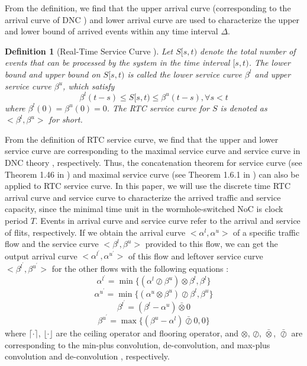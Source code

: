 \documentclass[10pt,journal]{IEEEtran}
\newtheorem{definition}{Definition}
\begin{document}
From the definition, we find that the upper arrival curve (corresponding to the arrival curve of DNC \cite{Boudec2001Network}) and lower arrival curve are used to characterize the upper and lower bound of arrived events within any time interval $\Delta$.

\begin{definition}[Real-Time Service Curve \cite{1253607}]
Let $S[s,t)$ denote the total number of events that can be processed by the system in the time interval $[s,t)$. The lower bound and upper bound on $S[s,t)$ is called the lower service curve $\beta^l$ and upper service curve $\beta^u$, which satisfy
$$\beta^l(t-s)\leq S[s,t)\leq \beta^u(t-s),\forall s<t$$
where $\beta^l(0)=\beta^u(0)=0$. The RTC service curve for $S$ is denoted as $<\beta^l,\beta^u>$ for short.
\end{definition}

From the definition of RTC service curve, we find that the upper and lower service curve are corresponding to the maximal service curve and service curve in DNC theory \cite{Boudec2001Network}, respectively. Thus, the concatenation theorem for service curve (see Theorem 1.46 in \cite{Boudec2001Network}) and maximal service curve (see Theorem 1.6.1 in \cite{Boudec2001Network}) can also be applied to RTC service curve. In this paper, we will use the discrete time RTC arrival curve and service curve to characterize the arrived traffic and service capacity, since the minimal time unit in the wormhole-switched NoC is clock period $T$. Events in arrival curve and service curve refer to the arrival and service of flits, respectively. If we obtain the arrival curve $<\alpha^l,\alpha^u>$ of a specific traffic flow and the service curve $<\beta^l,\beta^u>$ provided to this flow, we can get the output arrival curve $<\alpha^{l^\prime},\alpha^{u^\prime}>$ of this flow and leftover service curve $<\beta^{l^\prime},\beta^{u^\prime}>$ for the other flows with the following equations \cite{1253607}:
\begin{equation}\label{alphal}
\alpha^{l^\prime}=\min\{(\alpha^l\oslash\beta^u)\otimes\beta^l,\beta^l\}
\end{equation}
\begin{equation}\label{alphau}
\alpha^{u^\prime}=\min\{(\alpha^u\otimes\beta^u)\oslash\beta^l,\beta^u\}
\end{equation}
\begin{equation}\label{betal}
\beta^{l^\prime}=(\beta^l-\alpha^u)\bar{\otimes}0
\end{equation}
\begin{equation}\label{betau}
\beta^{u^\prime}=\max\{(\beta^u-\alpha^l)\bar{\oslash}0,0\}
\end{equation}
where $\lceil\cdot\rceil$, $\lfloor\cdot\rfloor$ are the ceiling operator and flooring operator, and $\otimes$, $\oslash$, $\bar{\otimes}$, $\bar{\oslash}$ are corresponding to the min-plus convolution, de-convolution, and max-plus convolution and de-convolution \cite{Boudec2001Network}, respectively.
\end{document}
